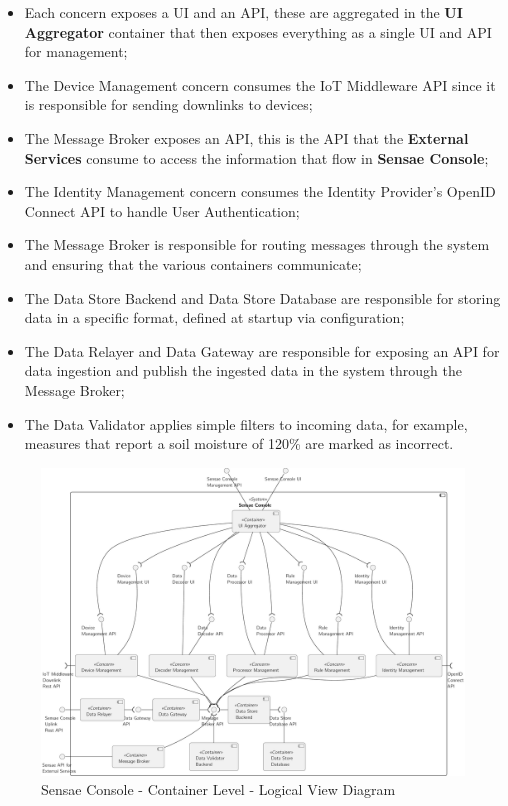 \begin{itemize}
   \item Each concern exposes a \gls{UI} and an \gls{API}, these are aggregated in the \textbf{UI Aggregator} container that then exposes everything as a single \gls{UI} and \gls{API} for management;
   \item The Device Management concern consumes the \gls{IoT} Middleware API since it is responsible for sending downlinks to devices;
   \item The Message Broker exposes an \gls{API}, this is the \gls{API} that the \textbf{External Services} consume to access the information that flow in \textbf{Sensae Console};
   \item The Identity Management concern consumes the Identity Provider's OpenID Connect API to handle User Authentication;
   \item The Message Broker is responsible for routing messages through the system and ensuring that the various containers communicate;
   \item The Data Store Backend and Data Store Database are responsible for storing data in a specific format, defined at startup via configuration;
   \item The Data Relayer and Data Gateway are responsible for exposing an \gls{API} for data ingestion and publish the ingested data in the system through the Message Broker;
   \item The Data Validator applies simple filters to incoming data, for example, measures that report a soil moisture of 120\% are marked as incorrect.
\end{itemize}

\begin{figure}
   \centering
   \includegraphics[page=1,width=0.8\columnwidth]{assets/diagrams/design/architectural/level2/logical/contexts-v2.pdf}
   \caption[Sensae Console - Container Level - Logical View Diagram]{Sensae Console - Container Level - Logical View Diagram}
      \label{fig:design:architecture:platform:containers:logical:complete}
\end{figure}

